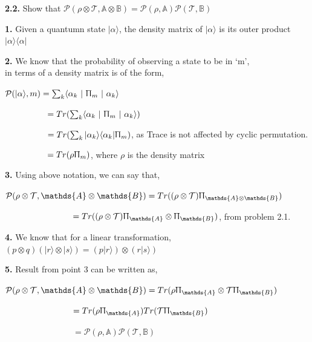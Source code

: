 \documentclass [12pt]{article}
\theoremstyle{definition}
\newcommand{\ket}[1]{| {#1} \rangle}
\newcommand{\bra}[1]{\langle {#1} |}
\newcommand{\qp}[2]{\langle #1 \ | \ #2 \ | \ #1 \rangle}
\begin{document}
\newpage

{\bf 2.2.} Show that $\mathcal{P}(\rho \otimes \mathcal{T}, \mathds{A} \otimes \mathds{B}) = \mathcal{P}(\rho, \mathds{A})\mathcal{P}(\mathcal{T}, \mathds{B})$

\phantom{1em} {\bf 1.} Given a quantumn state $\ket{\alpha}$, the density matrix of $\ket{\alpha}$ is its outer product $\ket{\alpha}\bra{\alpha}$

\phantom{1em} {\bf 2.} We know that the probability of observing a state to be in `m', \\
\phantom{1000em} in terms of a density matrix is of the form,

\phantom{1000em} $\mathcal{P}(\ket{\alpha}, m) = \sum_{k}\qp{\alpha_{k}}{\Uppi_{m}}$

\phantom{1000em} $\quad\quad\quad\quad\quad = Tr(\sum_{k}\qp{\alpha_{k}}{\Uppi_{m}})$

\phantom{1000em} $\quad\quad\quad\quad\quad = Tr(\sum_{k}\ket{\alpha_{k}}\bra{\alpha_{k}}\Uppi_{m})$, as Trace is not affected by cyclic permutation.

\phantom{1000em} $\quad\quad\quad\quad\quad = Tr(\rho\Uppi_{m})$, where $\rho$ is the density matrix

\phantom{1em} {\bf 3.} Using above notation, we can say that,

\phantom{1000em} $\mathcal{P}(\rho \otimes \mathcal{T}, \mathds{A} \otimes \mathds{B}) = Tr((\rho \otimes \mathcal{T})\Uppi_{\mathds{A} \otimes \mathds{B}})$

\phantom{1000em} $\quad\quad\quad\quad\quad\quad\quad\quad = Tr((\rho \otimes \mathcal{T})\Uppi_{\mathds{A}} \otimes \Uppi_{\mathds{B}})$, from problem 2.1.

\phantom{1em} {\bf 4.} We know that for a linear transformation, $(p \otimes q)(\ket{r} \otimes \ket{s}) = (p\ket{r})\otimes(r\ket{s})$

\phantom{1em} {\bf 5.} Result from point 3 can be written as,

\phantom{1000em} $\mathcal{P}(\rho \otimes \mathcal{T}, \mathds{A} \otimes \mathds{B}) = Tr(\rho\Uppi_{\mathds{A}} \otimes \mathcal{T}\Uppi_{\mathds{B}})$

\phantom{1000em} $ \quad\quad\quad\quad\quad\quad\quad\quad= Tr(\rho\Uppi_{\mathds{A}})Tr(\mathcal{T}\Uppi_{\mathds{B}})$

\phantom{1000em} $ \quad\quad\quad\quad\quad\quad\quad\quad= \mathcal{P}(\rho, \mathds{A})\mathcal{P}(\mathcal{T}, \mathds{B})$
\end{document}
